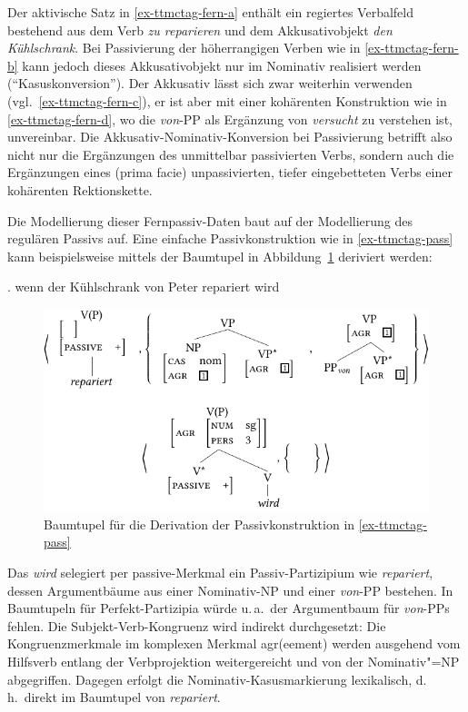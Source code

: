 Der aktivische Satz in \ref{ex-ttmctag-fern-a} enthält ein regiertes Verbalfeld bestehend aus dem Verb {\it zu reparieren} und dem Akkusativobjekt {\it den Kühlschrank}. Bei Passivierung der höherrangigen Verben wie in \ref{ex-ttmctag-fern-b} kann jedoch dieses Akkusativobjekt nur im Nominativ realisiert werden ("`Kasuskonversion"'). Der Akkusativ lässt sich zwar weiterhin verwenden (vgl.\ \ref{ex-ttmctag-fern-c}), er ist aber mit einer kohärenten Konstruktion wie in \ref{ex-ttmctag-fern-d}, wo die {\it von}-PP als Ergänzung von \textit{versucht} zu verstehen ist, unvereinbar. Die Akkusativ-Nominativ-Konversion bei Passivierung betrifft also nicht nur die Ergänzungen des unmittelbar passivierten Verbs, sondern auch die Ergänzungen eines (prima facie) unpassivierten, tiefer eingebetteten Verbs einer kohärenten Rektionskette.

Die Modellierung dieser Fernpassiv-Daten baut auf der Modellierung des regulären Passivs auf. Eine einfache Passivkonstruktion wie in \ref{ex-ttmctag-pass} kann beispielsweise mittels der Baumtupel in Abbildung~\ref{fig-ttmctag-pass-1} deriviert werden:

\ex. \label{ex-ttmctag-pass} wenn der Kühlschrank von Peter repariert wird

\begin{figure}[t]
\centering
\includegraphics{graphics/abb722.pdf}
\caption{\label{fig-ttmctag-pass-1}Baumtupel für die Derivation der Passivkonstruktion in \ref{ex-ttmctag-pass}}
\end{figure} 
Das  {\it wird} selegiert per {\sc passive}-Merkmal ein Passiv-Partizipium wie {\it repariert}, dessen Argumentbäume aus einer Nominativ-NP und einer \emph{von}-PP bestehen. In Baumtupeln für Perfekt-Partizipia würde u.\,a.\ der Argumentbaum für \emph{von}-PPs fehlen. Die Subjekt-Verb-Kongruenz wird indirekt durchgesetzt: Die Kongruenzmerkmale im komplexen Merkmal {\sc agr(eement)} werden ausgehend vom Hilfsverb entlang der Verbprojektion  weitergereicht und von der Nominativ"=NP abgegriffen. Dagegen erfolgt die Nominativ-Kasusmarkierung lexikalisch, d.\,h.\ direkt im Baumtupel von {\it repariert}.

